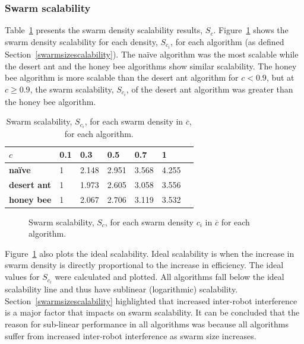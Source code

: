 \documentclass[preprint,12pt]{elsarticle}
\begin{document}
\subsubsection{Swarm scalability}
\label{results:swarmscalability}

Table~\ref{table:swarmscalability} presents the swarm density scalability results, $S_c$. Figure~\ref{fig:swarmscalability} shows the swarm density scalability for each density, $S_{c_i}$, for each algorithm (as defined Section~\ref{swarmsizescalability}). The na\"ive algorithm was the most scalable while the desert ant and the honey bee algorithms show similar scalability. The honey bee algorithm is more scalable than the desert ant algorithm for $c < 0.9$, but at $c \geq 0.9$, the swarm scalability, $S_{c_i}$, of the desert ant algorithm was greater than the honey bee algorithm.

\begin{table}[!htbp]
\centering
\caption{Swarm scalability, $S_{c_i}$, for each swarm density in $\overline{c}$, for each algorithm.}
\label{table:swarmscalability}
\begin{tabular}{@{}lllllll@{}}
\toprule
\textbf{$c$}            & \textbf{0.1} & \textbf{0.3}         & \textbf{0.5}         & \textbf{0.7}         & \textbf{1}           \\ \midrule
\textbf{na\"ive}    & 1   & 2.148 & 2.951  & 3.568 & 4.255  \\
\textbf{desert ant} & 1   & 1.973 & 2.605 & 3.058  & 3.556 \\
\textbf{honey bee}  & 1   & 2.067 & 2.706 & 3.119 & 3.532 \\ \bottomrule
\end{tabular}
\end{table}

\begin{figure}[htb]
\centering
\small
\resizebox{\textwidth}{!}{}
\caption{Swarm scalability, $S_c$, for each swarm density $c_i$ in $\overline{c}$ for each algorithm.}
\label{fig:swarmscalability}
\end{figure}

Figure~\ref{fig:swarmscalability} also plots the ideal scalability. Ideal scalability is when the increase in swarm density is directly proportional to the increase in efficiency. The ideal values for $S_{c_i}$ were calculated and plotted. All algorithms fall below the ideal scalability line and thus have sublinear (logarithmic) scalability. Section~\ref{swarmsizescalability} highlighted that increased inter-robot interference is a major factor that impacts on swarm scalability. It can be concluded that the reason for sub-linear performance in all algorithms was because all algorithms suffer from increased inter-robot interference as swarm size increases.
\end{document}
